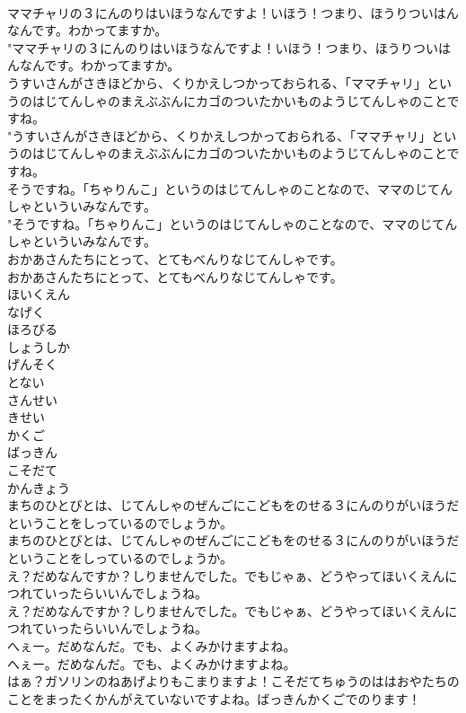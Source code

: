 \documentclass[8pt]{extreport}
\begin{document}
\begin{CJK}{UTF8}{min}
\\	ママチャリの３にんのりはいほうなんですよ！いほう！つまり、ほうりついはんなんです。わかってますか。	
\\	"ママチャリの３にんのりはいほうなんですよ！いほう！つまり、ほうりついはんなんです。わかってますか。 
\\	うすいさんがさきほどから、くりかえしつかっておられる、「ママチャリ」というのはじてんしゃのまえぶぶんにカゴのついたかいものようじてんしゃのことですね。	
\\	"うすいさんがさきほどから、くりかえしつかっておられる、「ママチャリ」というのはじてんしゃのまえぶぶんにカゴのついたかいものようじてんしゃのことですね。 
\\	そうですね。「ちゃりんこ」というのはじてんしゃのことなので、ママのじてんしゃといういみなんです。	
\\	"そうですね。「ちゃりんこ」というのはじてんしゃのことなので、ママのじてんしゃといういみなんです。 
\\	おかあさんたちにとって、とてもべんりなじてんしゃです。	
\\	おかあさんたちにとって、とてもべんりなじてんしゃです。 
\\	ほいくえん
\\	なげく
\\	ほろびる
\\	しょうしか
\\	げんそく
\\	とない
\\	さんせい
\\	きせい
\\	かくご
\\	ばっきん
\\	こそだて
\\	かんきょう
\\	まちのひとびとは、じてんしゃのぜんごにこどもをのせる３にんのりがいほうだということをしっているのでしょうか。	
\\	まちのひとびとは、じてんしゃのぜんごにこどもをのせる３にんのりがいほうだということをしっているのでしょうか。 
\\	え？だめなんですか？しりませんでした。でもじゃぁ、どうやってほいくえんにつれていったらいいんでしょうね。	
\\	え？だめなんですか？しりませんでした。でもじゃぁ、どうやってほいくえんにつれていったらいいんでしょうね。 
\\	へぇー。だめなんだ。でも、よくみかけますよね。	
\\	へぇー。だめなんだ。でも、よくみかけますよね。 
\\	はぁ？ガソリンのねあげよりもこまりますよ！こそだてちゅうのははおやたちのことをまったくかんがえていないですよね。ばっきんかくごでのります！	

\end{CJK}
\end{document}
